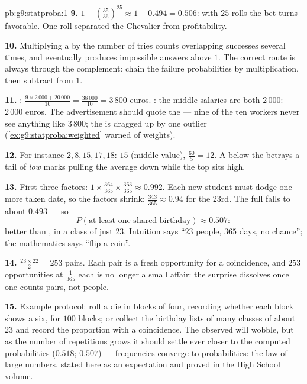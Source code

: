 \begin{solution}{pb:g9:statproba:1}
\textbf{9.} $1 - \left(\frac{35}{36}\right)^{25} \approx
1 - 0.494 = 0.506$: with $25$ rolls the bet turns favorable.
One roll separated the Chevalier from profitability.

\textbf{10.} Multiplying a  by the number of tries
counts overlapping successes several times, and eventually
produces impossible answers above $1$. The correct route is
always through the complement: chain the failure probabilities
by multiplication, then subtract from $1$.

\textbf{11.} : $\frac{9 \times 2\,000 + 20\,000}{10} =
\frac{38\,000}{10} = 3\,800$ euros. : the middle salaries
are both $2\,000$:  $2\,000$ euros. The advertisement
should quote the  --- nine of the ten workers never see
anything like $3\,800$; the  is dragged up by one
outlier (\cref{ex:g9:statproba:weighted} warned of weights).

\textbf{12.} For instance $2, 8, 15, 17, 18$:  $15$
(middle value),  $\frac{60}{5} = 12$. A  below the
 betrays a tail of \emph{low} marks pulling the average
down while the top  sits high.

\textbf{13.} First three factors:
$1 \times \frac{364}{365} \times \frac{363}{365} \approx
0.992$. Each new student must dodge one more taken date, so the
factors shrink: $\frac{343}{365} \approx 0.94$ for the
$23$rd. The full  falls to about $0.493$ --- so
\[
P(\text{at least one shared birthday}) \approx 0.507 :
\]
better than , in a class of just $23$. Intuition says
``$23$ people, $365$ days, no chance''; the mathematics says
``flip a coin''.

\textbf{14.} $\frac{23 \times 22}{2} = 253$ pairs. Each pair is
a fresh opportunity for a coincidence, and $253$ opportunities
at $\frac{1}{365}$ each is no longer a small affair: the
surprise dissolves once one counts pairs, not people.

\textbf{15.} Example protocol: roll a die in blocks of four,
recording whether each block shows a six, for $100$ blocks; or
collect the birthday lists of many classes of about $23$ and
record the proportion with a coincidence. The observed
 will wobble, but as the number of repetitions grows
it should settle ever closer to the computed probabilities
($0.518$; $0.507$) --- frequencies converge to probabilities:
the law of large numbers, stated here as an expectation and
proved in the High School volume.
\end{solution}
